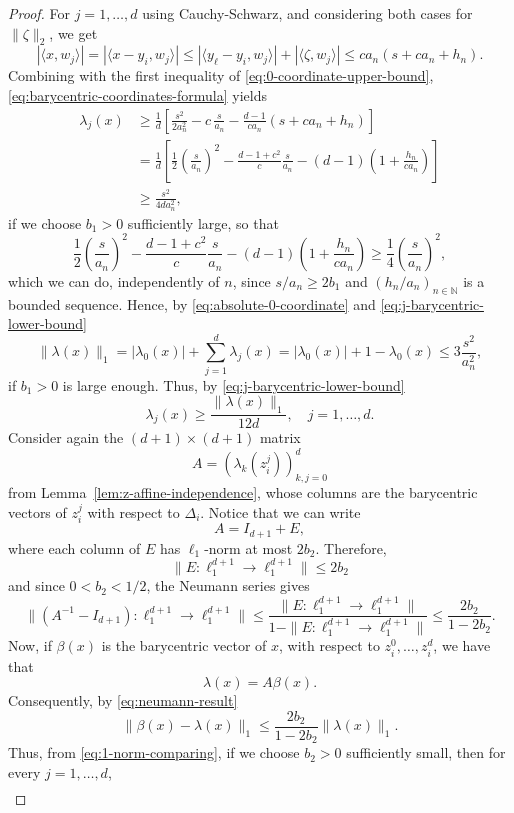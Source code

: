 \documentclass[10pt]{amsart}
\newcommand{\1}{\textbf{1}}
\numberwithin{equation}{section} %
\theoremstyle{remark}
\theoremstyle{definition}
\begin{document}
\begin{proof}
For $j=1,\ldots,d$ using Cauchy-Schwarz, and considering both cases for $\|\zeta\|_2$, we get \[|\langle x,w_j\rangle|=|\langle x-y_i,w_j \rangle| \leq|\langle y_\ell-y_i,w_j \rangle| +|\langle \zeta,w_j \rangle| \leq ca_n(s+ca_n+h_n).\] Combining with the first inequality of \eqref{eq:0-coordinate-upper-bound}, \eqref{eq:barycentric-coordinates-formula} yields \begin{equation}\label{eq:j-barycentric-lower-bound}
    \begin{aligned}
        \lambda_j(x) & \geq \frac{1}{d}\left[ \frac{s^2}{2a_n^2}-c\,\frac{s}{a_n}-\frac{d-1}{ca_n}\left(s+ca_n+h_n\right)\right]\\
        &=\frac{1}{d}\left[\frac{1}{2}\left(\frac{s}{a_n}\right)^2-\frac{d-1+c^2}{c}\frac{s}{a_n}-(d-1)\left(1+\frac{h_n}{ca_n}\right)\right] \\
        &\geq \frac{s^2}{4da_n^2}, 
    \end{aligned} 
\end{equation} if we choose $b_1>0$ sufficiently large, so that \[\frac{1}{2}\left(\frac{s}{a_n}\right)^2-\frac{d-1+c^2}{c}\frac{s}{a_n}-(d-1)\left(1+\frac{h_n}{ca_n}\right)\geq \frac{1}{4}\left(\frac{s}{a_n}\right)^2,\] which we can do, independently of $n$, since $s/a_n \geq 2b_1$ and $(h_n/a_n)_{n\in \mathbb{N}}$ is a bounded sequence. Hence, by \eqref{eq:absolute-0-coordinate} and \eqref{eq:j-barycentric-lower-bound}  \[\|\lambda(x)\|_1=|\lambda_0(x)|+\sum_{j=1}^{d}\lambda_j(x) =|\lambda_0(x)|+1-\lambda_0(x) \leq 3 \frac{s^2}{a_n^2},\] if $b_1>0$ is large enough. Thus, by \eqref{eq:j-barycentric-lower-bound} \begin{equation}\label{eq:1-norm-comparing}
    \lambda_j(x) \geq \frac{\|\lambda(x)\|_1}{12d}, \quad j=1,\ldots,d.
\end{equation} Consider again the $(d+1)\times(d+1)$ matrix \[A=(\lambda_k(z_i^j))_{k,j=0}^d\] from Lemma~\ref{lem:z-affine-independence}, whose columns are the barycentric vectors of $z_i^j$ with respect to $\Delta_i$. Notice that we can write \[A=I_{d+1}+E,\] where each column of $E$ has $\ell_1$-norm at most $2b_2$. Therefore, \[\|E:\ell_1^{d+1}\to \ell_1^{d+1}\| \leq 2b_2\] and since $0<b_2<1/2$, the Neumann series gives \begin{equation}\label{eq:neumann-result}
    \|(A^{-1}-I_{d+1}): \ell_1^{d+1} \to \ell_1^{d+1}\| \leq \frac{\|E:\ell_1^{d+1}\to \ell_1^{d+1}\|}{1-\|E:\ell_1^{d+1}\to \ell_1^{d+1}\|} \leq \frac{2b_2}{1-2b_2}.
\end{equation} Now, if $\beta(x)$ is the barycentric vector of $x$, with respect to  $z_i^0,\ldots,z_i^d$, we have that \[\lambda(x)=A\beta(x).\] Consequently, by \eqref{eq:neumann-result} \[\|\beta(x)-\lambda(x)\|_1 \leq \frac{2b_2}{1-2b_2}\|\lambda(x)\|_1.\] Thus, from \eqref{eq:1-norm-comparing}, if we choose $b_2>0$ sufficiently small,  then for every $j=1,\ldots, d$, \begin{align*}

\end{align*}
\end{proof}
\end{document}
